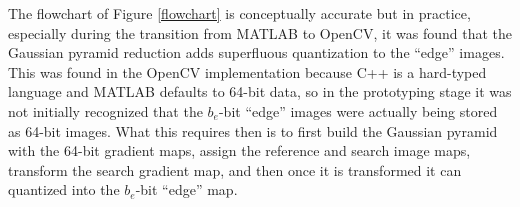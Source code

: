 The flowchart of Figure \ref{flowchart} is conceptually accurate but in practice, especially during the transition from MATLAB\textsuperscript{\textregistered} to OpenCV, it was found that the Gaussian pyramid reduction adds superfluous quantization to the ``edge'' images. This was found in the OpenCV implementation because C++ is a hard-typed language and MATLAB\textsuperscript{\textregistered} defaults to 64-bit data, so in the prototyping stage it was not initially recognized that the $b_{e}$-bit ``edge'' images were actually being stored as 64-bit images. What this requires then is to first build the Gaussian pyramid with the 64-bit gradient maps, assign the reference and search image maps, transform the search gradient map, and then once it is transformed it can quantized into the $b_{e}$-bit ``edge'' map.


